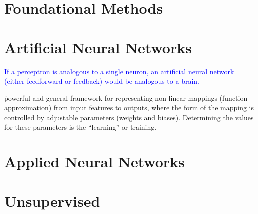\chapter{Foundational Methods}















\chapter{Artificial Neural Networks}

\textcolor{blue}{If a perceptron is analogous to a single neuron, an artificial neural network (either feedforward or feedback) would be analogous to a brain.}

\r{powerful and general framework for representing non-linear mappings (function approximation) from input features to outputs, where the form of the mapping is controlled by adjustable parameters (weights and biases). Determining the values for these parameters is the ``learning'' or training.}










\chapter{Applied Neural Networks}




\chapter{Unsupervised}

